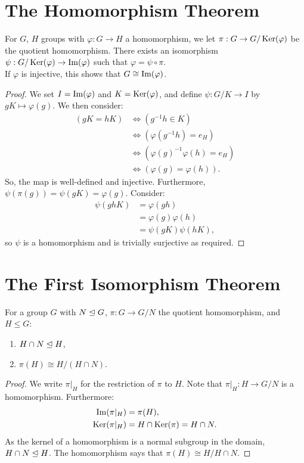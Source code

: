 \section{The Homomorphism Theorem}

For $G$, $H$ groups with $\varphi : G \to H$ a homomorphism, we let 
$\pi : G \to G / \operatorname{Ker}(\varphi)$ be the quotient homomorphism.
There exists an isomorphism $\psi : G / \operatorname{Ker}(\varphi) \to \operatorname{Im}(\varphi)$
such that $\varphi = \psi \circ \pi$.
\\[\baselineskip]
If $\varphi$ is injective, this shows that $G \cong \operatorname{Im}(\varphi)$.

\begin{proof}
    We set $I = \operatorname{Im}(\varphi)$ and $K = \operatorname{Ker}(\varphi)$, and define 
    $\psi : G / K \to I$ by $gK \mapsto \varphi(g)$. We then consider:
    \begin{align*}
        (gK = hK) &\Longleftrightarrow (g^{-1}h \in K) \\
        &\Longleftrightarrow (\varphi(g^{-1}h) = e_H) \\
        &\Longleftrightarrow (\varphi(g)^{-1}\varphi(h) = e_H) \\
        &\Longleftrightarrow (\varphi(g) = \varphi(h)).
    \end{align*} So, the map is well-defined and injective.
    Furthermore, $\psi(\pi(g)) = \psi(gK) = \varphi(g)$.
    Consider: \begin{align*}
        \psi(ghK) &= \varphi(gh) \\
        &= \varphi(g)\varphi(h) \\
        &= \psi(gK)\psi(hK),
    \end{align*} so $\psi$ is a homomorphism and is 
    trivially surjective as required.
\end{proof}

\section{The First Isomorphism Theorem}

For a group $G$ with $N \trianglelefteq G$, $\pi : G \to G/N$ the
quotient homomorphism, and $H \leq G$: \begin{enumerate}
    \item $H \cap N \trianglelefteq H$,
    \item $\pi(H) \cong H/(H \cap N)$.
\end{enumerate}

\begin{proof}
    We write $\pi|_H$ for the restriction of $\pi$ to $H$.
    Note that $\pi|_H : H \to G/N$ is a homomorphism.
    Furthermore: \begin{align*}
        \operatorname{Im}(\pi|_H) &= \pi(H), \\
        \operatorname{Ker}(\pi|_H) &= H \cap \operatorname{Ker}(\pi) = H \cap N.
    \end{align*} As the kernel of a homomorphism
    is a normal subgroup in the domain, $H \cap N \trianglelefteq H$.
    The homomorphism says that $\pi(H) \cong H / H \cap N$.
\end{proof}

